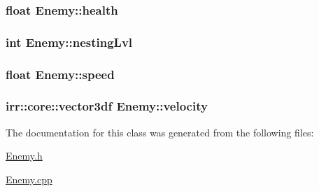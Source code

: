 \hypertarget{class_enemy_a131756bf793f8d63a3b9a2b728992380}{
\subsubsection[{health}]{\setlength{\rightskip}{0pt plus 5cm}float Enemy\-::health\hspace{0.3cm}{\ttfamily [private]}}}\label{class_enemy_a131756bf793f8d63a3b9a2b728992380}
\hypertarget{class_enemy_a28a5b00705199ef986435768edb53d48}{
\subsubsection[{nesting\-Lvl}]{\setlength{\rightskip}{0pt plus 5cm}int Enemy\-::nesting\-Lvl\hspace{0.3cm}{\ttfamily [private]}}}\label{class_enemy_a28a5b00705199ef986435768edb53d48}
\hypertarget{class_enemy_a98766d083fc49e746a37d0dc69be09e0}{
\subsubsection[{speed}]{\setlength{\rightskip}{0pt plus 5cm}float Enemy\-::speed\hspace{0.3cm}{\ttfamily [private]}}}\label{class_enemy_a98766d083fc49e746a37d0dc69be09e0}
\hypertarget{class_enemy_a01b8136e0754f278e48b63f25e2361bc}{
\subsubsection[{velocity}]{\setlength{\rightskip}{0pt plus 5cm}irr\-::core\-::vector3df Enemy\-::velocity\hspace{0.3cm}{\ttfamily [private]}}}\label{class_enemy_a01b8136e0754f278e48b63f25e2361bc}


The documentation for this class was generated from the following files\-:\begin{DoxyCompactItemize}
\item 
\hyperlink{_enemy_8h}{Enemy.\-h}\item 
\hyperlink{_enemy_8cpp}{Enemy.\-cpp}\end{DoxyCompactItemize}
